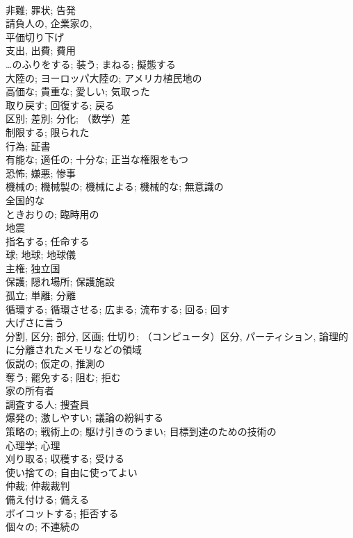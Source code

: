 \documentclass[8pt]{extreport}
\begin{document}
\begin{CJK}{UTF8}{min}
\\	非難; 罪状; 告発	
\\	請負人の, 企業家の,
\\	平価切り下げ	
\\	支出, 出費; 費用	
\\	…のふりをする; 装う; まねる; 擬態する	
\\	大陸の; ヨーロッパ大陸の; アメリカ植民地の	
\\	高価な; 貴重な; 愛しい; 気取った	
\\	取り戻す; 回復する; 戻る	
\\	区別; 差別; 分化; （数学）差	
\\	制限する; 限られた	
\\	行為; 証書	
\\	有能な; 適任の; 十分な; 正当な権限をもつ	
\\	恐怖; 嫌悪; 惨事	
\\	機械の; 機械製の; 機械による; 機械的な; 無意識の	
\\	全国的な	
\\	ときおりの; 臨時用の	
\\	地震	
\\	指名する; 任命する	
\\	球; 地球; 地球儀	
\\	主権; 独立国	
\\	保護; 隠れ場所; 保護施設	
\\	孤立; 単離; 分離	
\\	循環する; 循環させる; 広まる; 流布する; 回る; 回す	
\\	大げさに言う	
\\	分割, 区分; 部分, 区画; 仕切り; （コンピュータ）区分, パーティション, 論理的に分離されたメモリなどの領域	
\\	仮説の; 仮定の, 推測の	
\\	奪う; 罷免する; 阻む; 拒む	
\\	家の所有者	
\\	調査する人; 捜査員	
\\	爆発の; 激しやすい; 議論の紛糾する	
\\	策略の; 戦術上の; 駆け引きのうまい; 目標到達のための技術の	
\\	心理学; 心理	
\\	刈り取る; 収穫する; 受ける	
\\	使い捨ての; 自由に使ってよい	
\\	仲裁; 仲裁裁判	
\\	備え付ける; 備える	
\\	ボイコットする; 拒否する	
\\	個々の; 不連続の	

\end{CJK}
\end{document}
